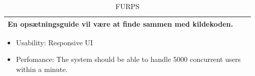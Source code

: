 \begin{table}[ht]
\begin{tabularx}{\textwidth}{|p{1cm}|X|X|}
        En opsætningsguide vil være at finde sammen med kildekoden. 
        \\ \hline
    \end{tabularx}
    \caption{FURPS}
    \label{tab:furps}
\end{table} 


\begin{itemize}
    \item Usability: Responsive UI
    \item Perfomance: The system should be able to handle 5000 concurrent users within a minute.
\end{itemize}
